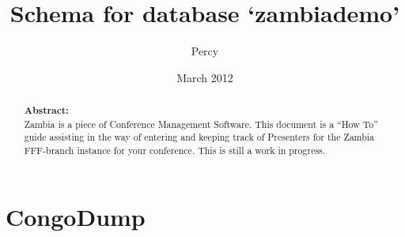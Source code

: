 \documentclass[tablesignature,landscape]{scrartcl}
\title{Schema for database `zambiademo'}
\author{Percy}
\date{March 2012}
\begin{document}
\maketitle


\thispagestyle{fancy}
\renewcommand{\headrulewidth}{0pt}
\renewcommand{\footrulewidth}{1pt}
\lhead{}
\rhead{}
\chead{}
\cfoot{}
\rfoot{\thepage}
\begin{abstract}
\vspace{5cm}
{\LARGE{\textbf{Abstract:\\}}}
Zambia is a piece of Conference Management Software.  This document is a ``How To'' guide assisting in the way of entering and keeping track of Presenters for the Zambia FFF-branch instance for your conference.  This is still a work in progress.
\end{abstract}
\newpage
\renewcommand{\headrulewidth}{1pt}
\tableofcontents
\newpage
{}
\section{CongoDump}
\label{sec-1}
\end{document}
